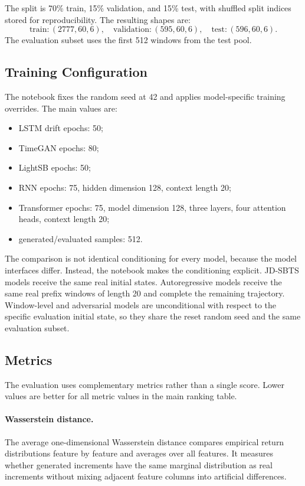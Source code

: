 \documentclass[11pt,a4paper]{article}
\begin{document}
The split is 70\% train, 15\% validation, and 15\% test, with shuffled split
indices stored for reproducibility. The resulting shapes are:
\begin{equation}
    \text{train}: (2777,60,6), \quad
    \text{validation}: (595,60,6), \quad
    \text{test}: (596,60,6).
\end{equation}
The evaluation subset uses the first 512 windows from the test pool.

\subsection{Training Configuration}

The notebook fixes the random seed at 42 and applies model-specific training
overrides. The main values are:
\begin{itemize}
    \item LSTM drift epochs: 50;
    \item TimeGAN epochs: 80;
    \item LightSB epochs: 50;
    \item RNN epochs: 75, hidden dimension 128, context length 20;
    \item Transformer epochs: 75, model dimension 128, three layers, four
    attention heads, context length 20;
    \item generated/evaluated samples: 512.
\end{itemize}

The comparison is not identical conditioning for every model, because the model
interfaces differ. Instead, the notebook makes the conditioning explicit.
JD-SBTS models receive the same real initial states. Autoregressive models
receive the same real prefix windows of length 20 and complete the remaining
trajectory. Window-level and adversarial models are unconditional with respect
to the specific evaluation initial state, so they share the reset random seed
and the same evaluation subset.

\subsection{Metrics}

The evaluation uses complementary metrics rather than a single score. Lower
values are better for all metric values in the main ranking table.

\paragraph{Wasserstein distance.}
The average one-dimensional Wasserstein distance compares empirical return
distributions feature by feature and averages over all features. It measures
whether generated increments have the same marginal distribution as real
increments without mixing adjacent feature columns into artificial differences.
\end{document}

